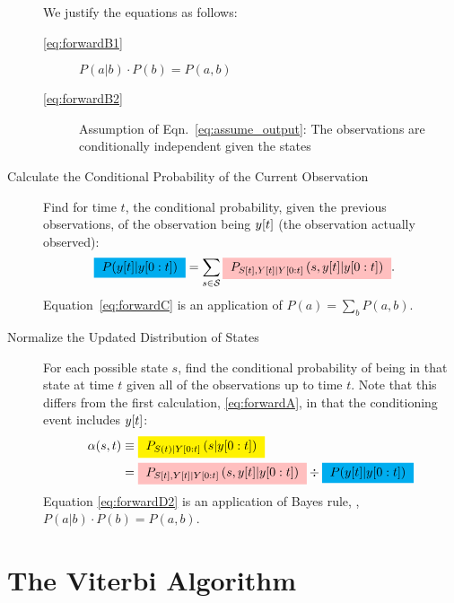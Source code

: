 \begin{description}
\begin{subequations}
  \end{subequations}
We justify the equations as follows:
\begin{description}
\item[\eqref{eq:forwardB1}]  $P(a|b)\cdot P(b) = P(a,b)$
\item[\eqref{eq:forwardB2}] Assumption of
  Eqn.~\eqref{eq:assume_output}: The observations are conditionally
  independent given the states
\end{description}
\item[Calculate the Conditional Probability of the Current Observation]
  Find for time $t$, the conditional probability, given the previous
  observations, of the observation being ${y}{[t]}$ (the observation actually
  observed):
  \begin{align}
    \mlabel{eq:forwardC}
    \gammax &= \sum_{s \in \states} \pregamma .
  \end{align}
Equation~\eqref{eq:forwardC} is an application of $P(a) = \sum_b P(a,b)$.
\item[Normalize the Updated Distribution of States] For each possible
  state $s$, find the conditional probability of being in that state
  at time $t$ given all of the observations up to time $t$.  Note that
  this differs from the first calculation, \eqref{eq:forwardA}, in that
  the conditioning event includes ${y}{[t]}$:%
  \begin{subequations}
    \label{eq:forwardD}
    \begin{align}
      \mlabel{eq:forwardD1}
      \alpha(s,t) &\equiv
      \alphax{t}{s} \\
      \mlabel{eq:forwardD2}
      &= \pregamma \div \gammax
    \end{align}
  \end{subequations}
  Equation \eqref{eq:forwardD2} is an application of Bayes rule, \ie,
  $P(a|b)\cdot P(b) = P(a,b)$.
\end{description}

\section{The Viterbi Algorithm}
\label{sec:viterbi}

